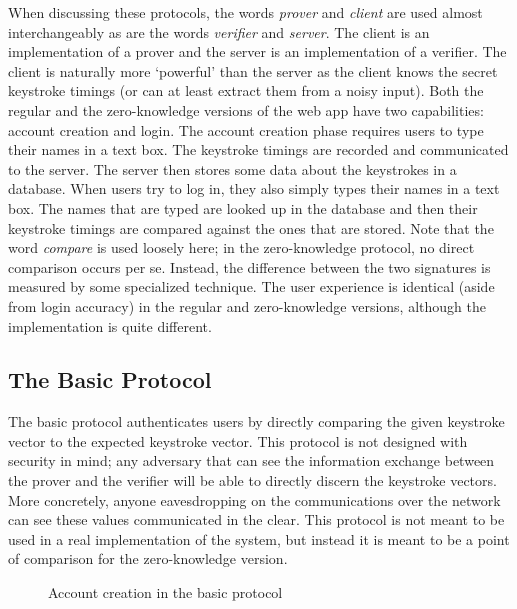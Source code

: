 \documentclass[11pt]{article}
\begin{document}
When discussing these protocols, the words \textit{prover} and \textit{client} are used almost interchangeably as are the words \textit{verifier} and \textit{server}. The client is an implementation of a prover and the server is an implementation of a verifier. The client is naturally more `powerful' than the server as the client knows the secret keystroke timings (or can at least extract them from a noisy input). Both the regular and the zero-knowledge versions of the web app have two capabilities: account creation and login. The account creation phase requires users to type their names in a text box. The keystroke timings are recorded and communicated to the server. The server then stores some data about the keystrokes in a database. When users try to log in, they also simply types their names in a text box. The names that are typed are looked up in the database and then their keystroke timings are compared against the ones that are stored. Note that the word \emph{compare} is used loosely here; in the zero-knowledge protocol, no direct comparison occurs per se. Instead, the difference between the two signatures is measured by some specialized technique. The user experience is identical (aside from login accuracy) in the regular and zero-knowledge versions, although the implementation is quite different.

\subsection{The Basic Protocol}
\label{sec:basic-prot}
The basic protocol authenticates users by directly comparing the given keystroke vector to the expected keystroke vector. This protocol is not designed with security in mind; any adversary that can see the information exchange between the prover and the verifier will be able to directly discern the keystroke vectors. More concretely, anyone eavesdropping on the communications over the network can see these values communicated in the clear. This protocol is not meant to be used in a real implementation of the system, but instead it is meant to be a point of comparison for the zero-knowledge version.

\begin{figure}[h!]
\centering
{}
\caption{Account creation in the basic protocol}
\label{fig:basic_new}
\end{figure}
\end{document}
